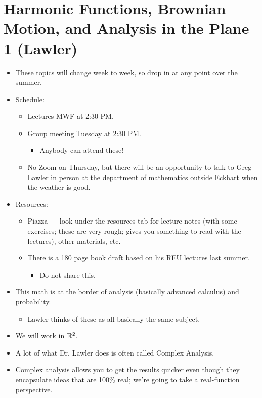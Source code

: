 \documentclass[../main.tex]{subfiles}
\begin{document}
\section{Harmonic Functions, Brownian Motion, and Analysis in the Plane 1 (Lawler)}
\begin{itemize}
    \item These topics will change week to week, so drop in at any point over the summer.
    \item Schedule:
    \begin{itemize}
        \item Lectures MWF at 2:30 PM.
        \item Group meeting Tuesday at 2:30 PM.
        \begin{itemize}
            \item Anybody can attend these!
        \end{itemize}
        \item No Zoom on Thursday, but there will be an opportunity to talk to Greg Lawler in person at the department of mathematics outside Eckhart when the weather is good.
    \end{itemize}
    \item Resources:
    \begin{itemize}
        \item Piazza --- look under the resources tab for lecture notes (with some exercises; these are very rough; gives you something to read with the lectures), other materials, etc.
        \item There is a 180 page book draft based on his REU lectures last summer.
        \begin{itemize}
            \item Do not share this.
        \end{itemize}
    \end{itemize}
    \item This math is at the border of analysis (basically advanced calculus) and probability.
    \begin{itemize}
        \item Lawler thinks of these as all basically the same subject.
    \end{itemize}
    \item We will work in $\mathbb{R}^2$.
    \item A lot of what Dr. Lawler does is often called Complex Analysis.
    \item Complex analysis allows you to get the results quicker even though they encapsulate ideas that are 100\% real; we're going to take a real-function perspective.

\end{itemize}
\end{document}
